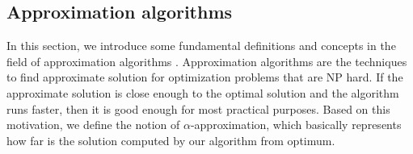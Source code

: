 % 
% 

\subsection{Approximation algorithms}
In this section, we introduce some fundamental definitions and concepts in the
field of approximation algorithms \citep{vazirani2013approximation}.
Approximation algorithms are the techniques to find approximate solution for optimization problems that are NP hard.
If the approximate solution is close enough to the optimal solution and the algorithm runs faster, then it is good enough for most practical purposes. 
Based on this motivation, we define the notion of $\alpha$-approximation, which basically represents how far is the solution computed by our algorithm from optimum.

